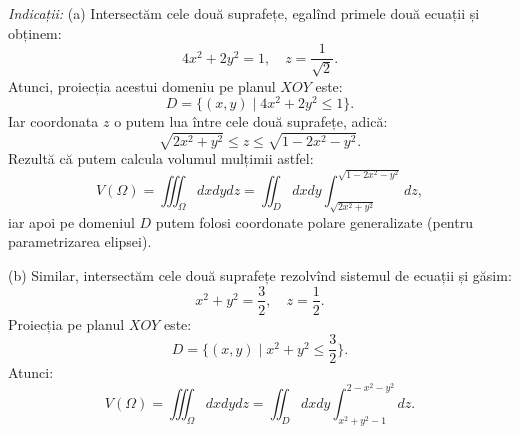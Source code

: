\documentclass[11pt,a4paper]{article}
\theoremstyle{dotless}
\theoremstyle{dotlessdr}
\begin{document}
\emph{Indicații:} (a) Intersectăm cele două suprafețe, egalînd primele două ecuații și
obținem:
\[
  4x^2 + 2y^2 = 1, \quad z = \frac{1}{\sqrt{2}}.
\]
Atunci, proiecția acestui domeniu pe planul $ XOY $ este:
\[
  D = \{(x, y) \mid 4x^2 + 2y^2 \leq 1 \}.
\]
Iar coordonata $ z $ o putem lua între cele două suprafețe, adică:
\[
  \sqrt{2x^2 + y^2} \leq z \leq \sqrt{1 - 2x^2 - y^2}.
\]
Rezultă că putem calcula volumul mulțimii astfel:
\[
  V(\Omega) = \iiint_\Omega dxdydz = \iint_D dxdy \int_{\sqrt{2x^2 + y^2}}^{\sqrt{1 - 2x^2 - y^2}} dz,
\]
iar apoi pe domeniul $ D $ putem folosi coordonate polare generalizate (pentru parametrizarea
elipsei).

\vspace{1cm}

(b) Similar, intersectăm cele două suprafețe rezolvînd sistemul de ecuații
și găsim:
\[
  x^2 + y^2 = \frac{3}{2}, \quad z = \frac{1}{2}.
\]
Proiecția pe planul $ XOY $ este:
\[
  D = \big\{ (x, y) \mid x^2 + y^2 \leq \frac{3}{2} \big\}.
\]
Atunci:
\[
  V(\Omega) = \iiint_\Omega dxdydz = \iint_D dxdy \int_{x^2 + y^2 - 1}^{2 - x^2 - y^2} dz.
\]
\end{document}
